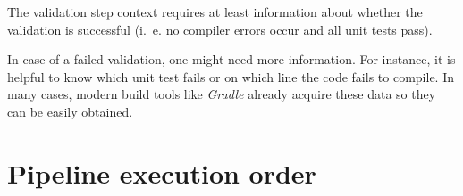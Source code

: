The validation step context requires at least information about whether the validation is successful (i.~e. no compiler errors occur and all unit tests pass). 

In case of a failed validation, one might need more information. For instance, it is helpful to know which unit test fails or on which line the code fails to compile. In many cases, modern build tools like \textit{Gradle} already acquire these data so they can be easily obtained. 
\begin{comment}

\section{Pipeline execution example}
Listing \ref{lst:math_stuff_java} will be used as the foundation to describe a detailed approach for fixing data clumps.

Looking at the parameters \textit{x}, \textit{y}, and \textit{z}, there are multiple suggestions for a class name. The most trivial one is a simple concatenation  (e.g., \textit{XYZ} or \textit{X\_Y\_Z}). However, this name is often not suitable as it can be hard to read and to understand its meaning.

A more suitable approach requires domain knowledge. It is common knowledge that the terms \textit{x}, \textit{y}, and \textit{z} are terms used in math to describe coordinates. Using this information, a fitting name could be \textit{Coordinate}. Simple methods would not have discovered this name as artificial or human intelligence is required. 



Since a suitable class name has been found, the following class can be created using previously obtained information. 

Listing \ref{lst:coordinate_java} shows an example implementation of a coordinate class. This class contains fields, getters, and setters for all method parameters. There is also a constructor for initialization. This respects Fowler's opinion that the extracted class should not be a mere data class but a functional class that can be easily extended and modified.


\end{comment}
\section{Pipeline execution order}\label{sec:pipeline_exec_order}

